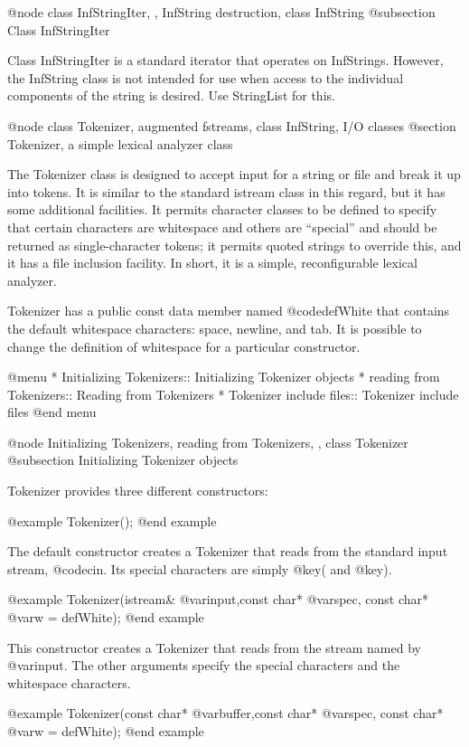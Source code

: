 @node class InfStringIter,  , InfString destruction, class InfString
@subsection Class InfStringIter

Class InfStringIter is a standard iterator that operates on
InfStrings.  However, the InfString class is not intended for
use when access to the individual components of the string is
desired.  Use StringList for this.

@node class Tokenizer, augmented fstreams, class InfString, I/O classes
@section Tokenizer, a simple lexical analyzer class

The Tokenizer class is designed to accept input for a string or file
and break it up into tokens.  It is similar to the standard istream
class in this regard, but it has some additional facilities.  It
permits character classes to be defined to specify that certain
characters are whitespace and others are ``special'' and should be
returned as single-character tokens; it permits quoted strings to
override this, and it has a file inclusion facility.  In short, it
is a simple, reconfigurable lexical analyzer.


Tokenizer has a public const data member named @code{defWhite}
that contains the default whitespace characters: space, newline,
and tab.  It is possible to change the definition of whitespace
for a particular constructor.

@menu
* Initializing Tokenizers::  Initializing Tokenizer objects
* reading from Tokenizers::  Reading from Tokenizers
* Tokenizer include files::  Tokenizer include files
@end menu

@node Initializing Tokenizers, reading from Tokenizers,  , class Tokenizer
@subsection Initializing Tokenizer objects

Tokenizer provides three different constructors:

@example
Tokenizer();
@end example

The default constructor creates a Tokenizer that reads from the
standard input stream, @code{cin}.  Its special characters are
simply @key{(} and @key{)}.

@example
Tokenizer(istream& @var{input},const char* @var{spec},
          const char* @var{w} = defWhite);
@end example

This constructor creates a Tokenizer that reads from the stream named
by @var{input}.  The other arguments specify the special characters
and the whitespace characters.

@example
Tokenizer(const char* @var{buffer},const char* @var{spec},
          const char* @var{w} = defWhite);
@end example

